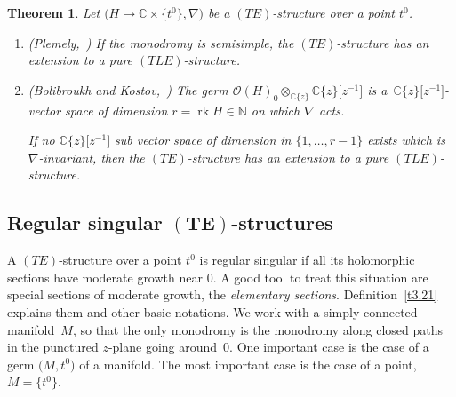 \documentclass[pdftex]{sigma}%
\numberwithin{equation}{section}
\numberwithin{figure}{section}
\newcommand{\N}{{\mathbb N}}
\newcommand{\C}{{\mathbb C}}
\newcommand{\OO}{{\mathcal O}}
\newcommand{\nnn}{\nabla}
\DeclareMathOperator{\rk}{rk}
\newtheorem{Theorem}{Theorem}[section]
\begin{document}
\begin{Theorem}\label{t3.20}
Let $\big(H\to\C\times\big\{t^0\big\},\nnn\big)$ be a $(TE)$-structure
over a point $t^0$.
\begin{enumerate}\itemsep=0pt
\item[$(a)$] {\rm (Plemely,~\cite[Chapter~IV, Corollary~2.6(1)]{Sa02})}
If the monodromy is semisimple, the $(TE)$-structure
has an extension to a pure $(TLE)$-structure.

\item[$(b)$] {\rm (Bolibroukh and Kostov,~\cite[Chapter~IV, Corollary 2.6(3)]{Sa02})}
The germ $\OO(H)_0\otimes_{\C\{z\}}\C\{z\}\big[z^{-1}\big]$ is a~$\C\{z\}\big[z^{-1}\big]$-vector space of dimension $r=\rk H\in\N$
on which $\nnn$ acts.

If no $\C\{z\}\big[z^{-1}\big]$ sub vector space of dimension
in $\{1,\dots ,r-1\}$ exists which is $\nnn$-invariant,
then the $(TE)$-structure has an extension to a
pure $(TLE)$-structure.
\end{enumerate}
\end{Theorem}

\subsection[Regular singular $(TE)$-structures]{Regular singular $\boldsymbol{(TE)}$-structures}%


A $(TE)$-structure over a point $t^0$ is regular singular
if all its holomorphic sections have moderate growth
near 0. A good tool to treat this situation are
special sections of moderate growth, the
{\it elementary sections}.
Definition~\ref{t3.21} explains them and other basic notations.
We work with a simply connected manifold~$M$,
so that the only monodromy is the monodromy along closed
paths in the punctured $z$-plane going around~0.
One important case is the case of a germ $\big(M,t^0\big)$
of a manifold.
The most important case is the case of a point, $M=\big\{t^0\big\}$.
\end{document}

